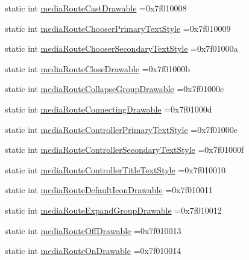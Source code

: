\begin{DoxyCompactItemize}
static int \hyperlink{classandroid_1_1support_1_1v7_1_1cardview_1_1R_1_1attr_a186bccb4d58a0789448fdd239d851f25}{media\+Route\+Cast\+Drawable} =0x7f010008
\item 
static int \hyperlink{classandroid_1_1support_1_1v7_1_1cardview_1_1R_1_1attr_ad2d45de3db3f45301165c149e4e20811}{media\+Route\+Chooser\+Primary\+Text\+Style} =0x7f010009
\item 
static int \hyperlink{classandroid_1_1support_1_1v7_1_1cardview_1_1R_1_1attr_a9c40842d57e474f03ba0002459fc14d2}{media\+Route\+Chooser\+Secondary\+Text\+Style} =0x7f01000a
\item 
static int \hyperlink{classandroid_1_1support_1_1v7_1_1cardview_1_1R_1_1attr_a99f4420078603d5f11efed05b8d90584}{media\+Route\+Close\+Drawable} =0x7f01000b
\item 
static int \hyperlink{classandroid_1_1support_1_1v7_1_1cardview_1_1R_1_1attr_a885fad46466663babb5eafdd7fcd364b}{media\+Route\+Collapse\+Group\+Drawable} =0x7f01000c
\item 
static int \hyperlink{classandroid_1_1support_1_1v7_1_1cardview_1_1R_1_1attr_a1553a474801f2e15d036bead87f5d93d}{media\+Route\+Connecting\+Drawable} =0x7f01000d
\item 
static int \hyperlink{classandroid_1_1support_1_1v7_1_1cardview_1_1R_1_1attr_ad5fcc1e3171be00702ab08f0b2d93963}{media\+Route\+Controller\+Primary\+Text\+Style} =0x7f01000e
\item 
static int \hyperlink{classandroid_1_1support_1_1v7_1_1cardview_1_1R_1_1attr_a3896a6593e2c81d1fe55111dd16580fd}{media\+Route\+Controller\+Secondary\+Text\+Style} =0x7f01000f
\item 
static int \hyperlink{classandroid_1_1support_1_1v7_1_1cardview_1_1R_1_1attr_a95f6de34da723fbef68a673b7161ce62}{media\+Route\+Controller\+Title\+Text\+Style} =0x7f010010
\item 
static int \hyperlink{classandroid_1_1support_1_1v7_1_1cardview_1_1R_1_1attr_aac78087806f7d50220dec324ed71c00c}{media\+Route\+Default\+Icon\+Drawable} =0x7f010011
\item 
static int \hyperlink{classandroid_1_1support_1_1v7_1_1cardview_1_1R_1_1attr_a15f9e2bf0c30dc8a103c38725ba9ff0f}{media\+Route\+Expand\+Group\+Drawable} =0x7f010012
\item 
static int \hyperlink{classandroid_1_1support_1_1v7_1_1cardview_1_1R_1_1attr_a92e8c10b8fe57bcb21cfec42ed6294f8}{media\+Route\+Off\+Drawable} =0x7f010013
\item 
static int \hyperlink{classandroid_1_1support_1_1v7_1_1cardview_1_1R_1_1attr_a3d42a901a73d757075b7fc2b208cb664}{media\+Route\+On\+Drawable} =0x7f010014

\end{DoxyCompactItemize}
